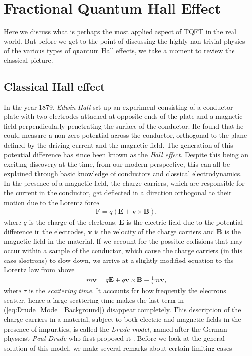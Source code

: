         \section{Fractional Quantum Hall Effect} \label{FQHE_sec}
        Here we discuss what is perhaps the most applied aspect of TQFT in the real world. But before we get to the point of discussing the highly non-trivial physics of the various types of quantum Hall effects, we take a moment to review the classical picture.
        \subsection{Classical Hall effect}
        In the year 1879, \textit{Edwin Hall} \cite{Hall1879} set up an experiment consisting of a conductor plate with two electrodes attached at opposite ends of the plate  and a magnetic field perpendicularly penetrating the surface of the conductor. He found that he could measure a non-zero potential across the conductor, orthogonal to the plane defined by the driving current and the magnetic field. The generation of this potential difference has since been known as the \textit{Hall effect}. Despite this being an exciting discovery at the time, from our modern perspective, this can all be explained through basic knowledge of conductors and classical electrodynamics. In the presence of a magnetic field, the charge carriers, which are responsible for the current in the conductor, get deflected in a direction orthogonal to their motion due to the Lorentz force
        \begin{align}
            { \bm F} = q(\bm{E} + \bm{v}\times \bm{B}),
        \end{align}
        where $q$ is the charge of the electrons, $\bm{E}$ is the electric field due to the potential difference in the electrodes, $\bm{v}$ is the velocity of the charge carriers and $\bm{B}$ is the magnetic field in the material. If we account for the possible collisions that may occur within a sample of the conductor, which cause the charge carriers (in this case electrons) to slow down, we arrive at a slightly modified equation to the Lorentz law from above
        \begin{align}
            m \dot{\bm{v}} = q \bm{E}+q \bm{v}\times \bm{B} - \frac{1}{\tau} m \bm{v}, \label{eq:Drude_Model_Background}
        \end{align}
        where $\tau$ is the \textit{scattering time}. It accounts for how frequently the electrons scatter, hence a large scattering time makes the last term in (\ref{eq:Drude_Model_Background}) disappear completely. This description of the charge carriers in a material, subject to both electric and magnetic fields in the presence of impurities, is called the \textit{Drude model}, named after the German physicist \textit{Paul Drude} who first proposed it \cite{Drude1900a, Drude1900b}. Before we look at the general solution of this model, we make several remarks about certain limiting cases.\\
